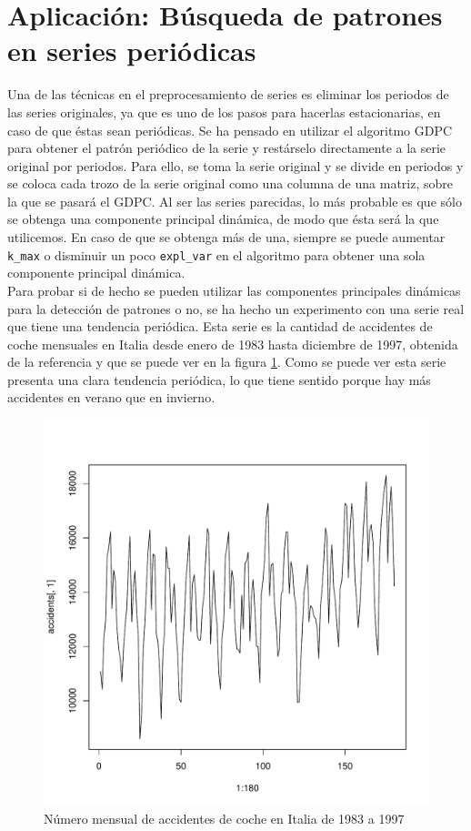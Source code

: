 \section{Aplicación: Búsqueda de patrones en series periódicas}

Una de las técnicas en el preprocesamiento de series es eliminar los periodos de las series originales, ya que es uno de los pasos para hacerlas estacionarias, en caso de que éstas sean periódicas. Se ha pensado en utilizar el algoritmo GDPC para obtener el patrón periódico de la serie y restárselo directamente a la serie original por periodos. Para ello, se toma la serie original y se divide en periodos y se coloca cada trozo de la serie original como una columna de una matriz, sobre la que se pasará el GDPC. Al ser las series parecidas, lo más probable es que sólo se obtenga una componente principal dinámica, de modo que ésta será la que utilicemos. En caso de que se obtenga más de una, siempre se puede aumentar \texttt{k\_max} o disminuir un poco \texttt{expl\_var} en el algoritmo para obtener una sola componente principal dinámica.\\

Para probar si de hecho se pueden utilizar las componentes principales dinámicas para la detección de patrones o no, se ha hecho un experimento con una serie real que tiene una tendencia periódica. Esta serie es la cantidad de accidentes de coche mensuales en Italia desde enero de 1983 hasta diciembre de 1997, obtenida de la referencia %
y que se puede ver en la figura \ref{f:accidents}. Como se puede ver esta serie presenta una clara tendencia periódica, lo que tiene sentido porque hay más accidentes en verano que en invierno.

\begin{figure}[]
 \includegraphics[width=\textwidth, height=0.4\textheight]{../imagenes/accidents.pdf}
 \caption{Número mensual de accidentes de coche en Italia de 1983 a 1997}
 \label{f:accidents}
\end{figure}

